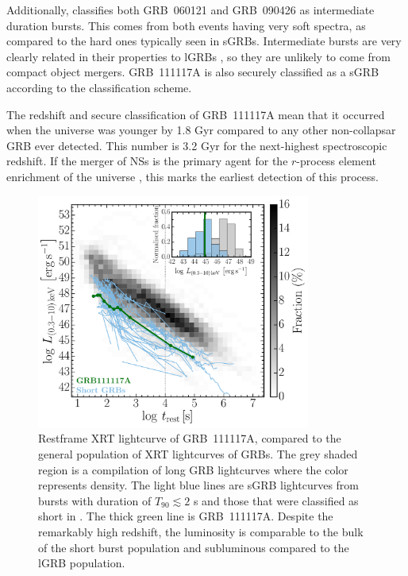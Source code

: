 \documentclass{aa}    %
\begin{document}
Additionally, \citet{Horvath2010} classifies both GRB~060121 and GRB~090426 as
intermediate duration bursts. This comes from both events having very soft
spectra, as compared to the hard ones typically seen in sGRBs. Intermediate
bursts are very clearly related in their properties to lGRBs
\citep{DeUgartePostigo2011}, so they are unlikely to come from compact object
mergers. GRB~111117A is also securely classified as a sGRB according to the
\citet{Horvath2010} classification scheme.

The redshift and secure classification of GRB~111117A mean that it occurred
when the universe was younger by 1.8 Gyr compared to any other non-collapsar GRB
ever detected. This number is 3.2 Gyr for the next-highest spectroscopic
redshift. If the merger of NSs is the primary agent for the $r$-process element
enrichment of the universe \citep{Goriely2011, Ji2016, Komiya2016}, this
marks the earliest detection of this process.

\begin{figure}
	\centering
	\includegraphics[width=9cm]{figures/XLC_111117A_rest.pdf}
	\caption{Restframe XRT lightcurve of GRB~111117A, compared to the general population of XRT lightcurves of GRBs. The grey shaded region is a compilation of long GRB lightcurves \citep{Evans2007, Evans2009} where the color represents density. The light blue lines are sGRB lightcurves from bursts with duration of $T_{90} \lesssim 2$ s and those that were classified as short in \citet{Kann2011, Berger2014, DAvanzo2014a}. The thick green line is GRB~111117A. Despite the remarkably high redshift, the luminosity is comparable to the bulk of the short burst population and subluminous compared to the lGRB population.}
	\label{fig:sxray_lightcurve}
\end{figure}
\end{document}

